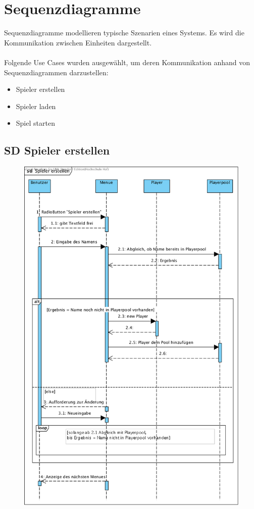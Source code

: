 \clearpage

\chapter{Sequenzdiagramme}
Sequenzdiagramme modellieren typische Szenarien eines Systems. Es wird die Kommunikation zwischen
Einheiten dargestellt.\\ \\
Folgende Use Cases wurden ausgewählt, um deren Kommunikation anhand von Sequenzdiagrammen darzustellen:\\
\begin{itemize}
  \item Spieler erstellen
  \item Spieler laden
  \item Spiel starten
\end{itemize}

\clearpage
\section{SD Spieler erstellen}
\begin{figure}[h!]
	\centering
    \includegraphics[width=13cm]{./SD_Spieler_erstellen.png}
	\label{layout_gesamt}
\end{figure}
